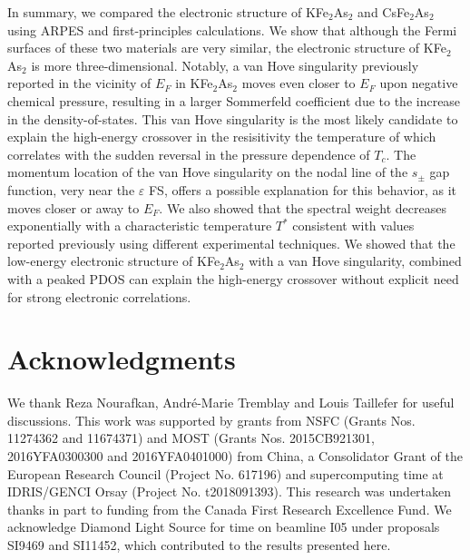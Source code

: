\documentclass[twocolumn,aps,showpacs,preprintnumbers,amsmath,amssymb, superscriptaddress,longbibliography]{revtex4-1}
\begin{document}
In summary, we compared the electronic structure of KFe$_2$As$_2$ and CsFe$_2$As$_2$ using ARPES and first-principles calculations. We show that although the Fermi surfaces of these two materials are very similar, the electronic structure of KFe$_2$As$_2$ is more three-dimensional. Notably, a van Hove singularity previously reported in the vicinity of $E_F$ in KFe$_2$As$_2$ moves even closer to $E_F$ upon negative chemical pressure, resulting in a larger Sommerfeld coefficient due to the increase in the density-of-states. This van Hove singularity is the most likely candidate to explain the high-energy crossover in the resisitivity 
the temperature of which correlates with the sudden reversal in the pressure dependence of $T_c$. The momentum location of the van Hove singularity on the nodal line of the $s_{\pm}$ gap function, very near the $\varepsilon$ FS, offers a possible explanation for this behavior, as it moves closer or away to $E_F$. We also showed that the spectral weight decreases exponentially with a characteristic temperature $T^*$ consistent with values reported previously using different experimental techniques. We showed that the low-energy electronic structure of KFe$_2$As$_2$ with a van Hove singularity, combined with a peaked PDOS can explain the high-energy crossover without explicit need for strong electronic correlations. 

\section*{Acknowledgments}

We thank Reza Nourafkan, Andr\'{e}-Marie Tremblay and Louis Taillefer for useful discussions. This work was supported by grants from NSFC (Grants Nos. 11274362 and 11674371) and MOST (Grants Nos. 2015CB921301, 2016YFA0300300 and 2016YFA0401000) from China, a Consolidator Grant of the European Research Council (Project No. 617196) and supercomputing time at IDRIS/GENCI Orsay (Project No. t2018091393). This research was undertaken thanks in part to funding from the Canada First Research Excellence Fund. We acknowledge Diamond Light Source for time on beamline I05 under proposals SI9469 and SI11452, which contributed to the results presented here. 


%

\end{document}
